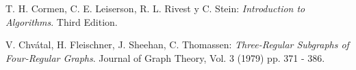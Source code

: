 \documentclass[10pt]{amsart}
\theoremstyle{definition}
\numberwithin{equation}{section}
\begin{document}
\bigskip
\begin{thebibliography}{20}
	
	 T. H. Cormen, C. E. Leiserson, R. L. Rivest y C. Stein: \emph{Introduction to Algorithms}. Third Edition.
	
	
	 V. Chv\'atal, H. Fleischner, J. Sheehan, C. Thomassen: \emph{Three-Regular Subgraphs of Four-Regular Graphs}. Journal of Graph Theory, Vol. 3 (1979) pp. 371 - 386.



	
\end{thebibliography}
\end{document}
